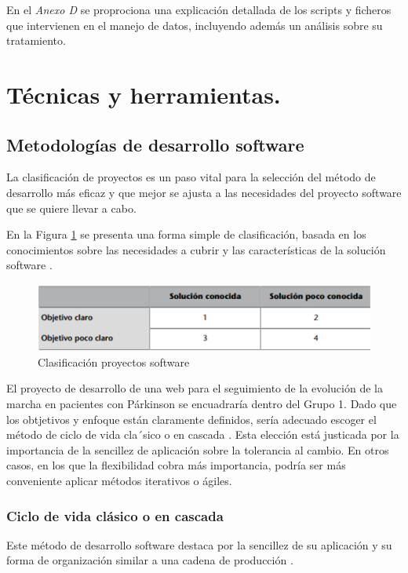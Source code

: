 En el \textit{Anexo D} se proprociona una explicación detallada de los scripts y ficheros que intervienen en el manejo de datos, incluyendo además un análisis sobre su tratamiento.

 
\section{Técnicas y herramientas.}


\subsection{Metodologías de desarrollo software}
La clasificación de proyectos es un paso vital para la selección del método de desarrollo más eficaz y que mejor se ajusta a las necesidades del proyecto software que se quiere llevar a cabo.

En la Figura \ref{fig:clasificacionProyectos} se presenta una forma simple de clasificación, basada en los conocimientos sobre las necesidades a cubrir y las características de la solución software \cite{pradel2013ingenieria}.

\begin{figure}[h]
    \centering
    \includegraphics[width=1\textwidth]{img/4.TecnicasHerramientas/Clasificacion.png}
    \caption{Clasificación proyectos software \cite{pradel2013ingenieria}}
    \label{fig:clasificacionProyectos}
\end{figure}

El proyecto de desarrollo de una web para el seguimiento de la evolución de la marcha en pacientes con Párkinson se encuadraría dentro del Grupo 1. Dado que los obtjetivos y enfoque están claramente definidos, sería adecuado escoger el método de ciclo de vida cla´sico o en cascada \cite{pradel2013ingenieria}. Esta elección está justicada por la importancia de la sencillez de aplicación sobre la tolerancia al cambio. En otros casos, en los que la flexibilidad cobra más importancia, podría ser más conveniente aplicar métodos iterativos o ágiles.

\subsubsection{Ciclo de vida clásico o en cascada}
Este método de desarrollo software destaca por la sencillez de su aplicación y su forma de organización similar a una cadena de producción \cite{pradel2013ingenieria}.

